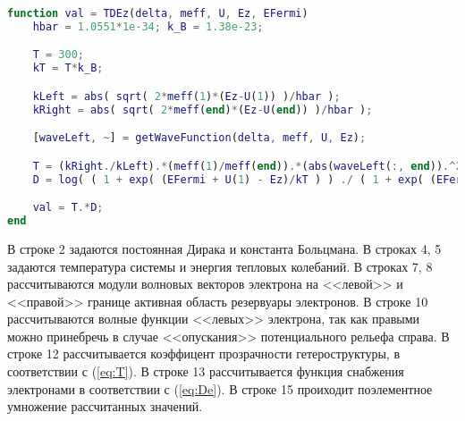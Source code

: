\begin{lstlisting}[style=realcode,language=Matlab,caption={Подъинтегральное выражение формулы Цу-Есаки (\ref{eq:J})},label={lst:TDEz}]
function val = TDEz(delta, meff, U, Ez, EFermi)
	hbar = 1.0551*1e-34; k_B = 1.38e-23;

	T = 300;
	kT = T*k_B;

	kLeft = abs( sqrt( 2*meff(1)*(Ez-U(1)) )/hbar );
	kRight = abs( sqrt( 2*meff(end)*(Ez-U(end)) )/hbar );

	[waveLeft, ~] = getWaveFunction(delta, meff, U, Ez);

	T = (kRight./kLeft).*(meff(1)/meff(end)).*(abs(waveLeft(:, end)).^2)';
	D = log( ( 1 + exp( (EFermi + U(1) - Ez)/kT ) ) ./ ( 1 + exp( (EFermi + U(end) - Ez)/kT ) ) );

	val = T.*D;
end
\end{lstlisting}
В строке 2 задаются постоянная Дирака и константа Больцмана. В строках 4, 5 задаются температура системы и энергия тепловых колебаний. В строках 7, 8 рассчитываются модули волновых векторов электрона на <<левой>> и <<правой>> границе активная область резервуары электронов. В строке 10 рассчитываются волные функции <<левых>> электрона, так как правыми можно принебречь в случае <<опускания>> потенциального рельефа справа. В строке 12 рассчитывается коэффицент прозрачности гетероструктуры, в соответствии с (\ref{eq:T}). В строке 13 рассчитывается функция снабжения электронами в соответствии с (\ref{eq:De}). В строке 15 проиходит поэлементное умножение рассчитанных значений.
